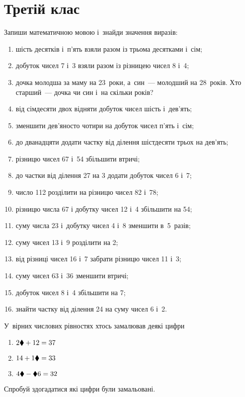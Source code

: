 \chapter{Третій клас}

\problem
Запиши математичною мовою і~знайди значення виразів:
\begin{enumerate}
    \item шість десятків і~п'ять взяли разом із трьома десятками і~сім;
    \item добуток чисел 7 і~3 взяли разом із різницею чисел 8 і~4;
    \item дочка молодша за маму на 23~роки, а~син~--- молодший на 28~років.
    Хто старший~--- дочка чи син і~на скільки років?
    \item від сімдесяти двох відняти добуток чисел шість і~дев'ять;
    \item зменшити дев'яносто чотири на добуток чисел п'ять і~сім;
    \item до дванадцяти додати частку від ділення шістдесяти трьох на дев'ять;
    \item різницю чисел 67 і~54 збільшити втричі;
    \item до частки від ділення 27 на 3 додати добуток чисел 6 і~7;
    \item число 112 розділити на різницю чисел 82 і~78;
    \item різницю числа 67 і добутку чисел 12 і~4 збільшити на 54;
    \item суму числа 23 і~добутку чисел 4 і~8 зменшити в~5~разів;
    \item суму чисел 13 і~9 розділити на 2;
    \item від різниці чисел 16 і~7 забрати різницю чисел 11 і~3;
    \item суму чисел 63 і~36 зменшити втричі;
    \item добуток чисел 8 і~4 збільшити на 7;
    \item знайти частку від ділення 24 на суму чисел 6 і~2.
\end{enumerate}


\problem
У~вірних числових рівностях хтось замалював деякі цифри
\begin{multicols}{2}
    \begin{enumerate}
        \item $2\blacklozenge + 12 = 37$
        \item $14 + 1\blacklozenge = 33$
        \item $4\blacklozenge - \blacklozenge6 = 32$
    \end{enumerate}
\end{multicols}
Спробуй здогадатися які цифри були замальовані.


